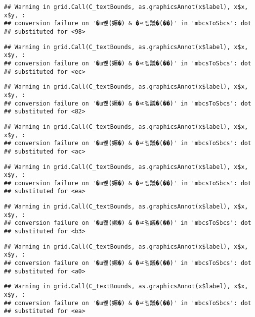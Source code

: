 \documentclass[
]{article}
\begin{document}
\begin{verbatim}
## Warning in grid.Call(C_textBounds, as.graphicsAnnot(x$label), x$x, x$y, :
## conversion failure on '�ш퀬(嫄�) & �ㅼ엥議�(��)' in 'mbcsToSbcs': dot
## substituted for <98>
\end{verbatim}

\begin{verbatim}
## Warning in grid.Call(C_textBounds, as.graphicsAnnot(x$label), x$x, x$y, :
## conversion failure on '�ш퀬(嫄�) & �ㅼ엥議�(��)' in 'mbcsToSbcs': dot
## substituted for <ec>
\end{verbatim}

\begin{verbatim}
## Warning in grid.Call(C_textBounds, as.graphicsAnnot(x$label), x$x, x$y, :
## conversion failure on '�ш퀬(嫄�) & �ㅼ엥議�(��)' in 'mbcsToSbcs': dot
## substituted for <82>
\end{verbatim}

\begin{verbatim}
## Warning in grid.Call(C_textBounds, as.graphicsAnnot(x$label), x$x, x$y, :
## conversion failure on '�ш퀬(嫄�) & �ㅼ엥議�(��)' in 'mbcsToSbcs': dot
## substituted for <ac>
\end{verbatim}

\begin{verbatim}
## Warning in grid.Call(C_textBounds, as.graphicsAnnot(x$label), x$x, x$y, :
## conversion failure on '�ш퀬(嫄�) & �ㅼ엥議�(��)' in 'mbcsToSbcs': dot
## substituted for <ea>
\end{verbatim}

\begin{verbatim}
## Warning in grid.Call(C_textBounds, as.graphicsAnnot(x$label), x$x, x$y, :
## conversion failure on '�ш퀬(嫄�) & �ㅼ엥議�(��)' in 'mbcsToSbcs': dot
## substituted for <b3>
\end{verbatim}

\begin{verbatim}
## Warning in grid.Call(C_textBounds, as.graphicsAnnot(x$label), x$x, x$y, :
## conversion failure on '�ш퀬(嫄�) & �ㅼ엥議�(��)' in 'mbcsToSbcs': dot
## substituted for <a0>
\end{verbatim}

\begin{verbatim}
## Warning in grid.Call(C_textBounds, as.graphicsAnnot(x$label), x$x, x$y, :
## conversion failure on '�ш퀬(嫄�) & �ㅼ엥議�(��)' in 'mbcsToSbcs': dot
## substituted for <ea>
\end{verbatim}
\end{document}
